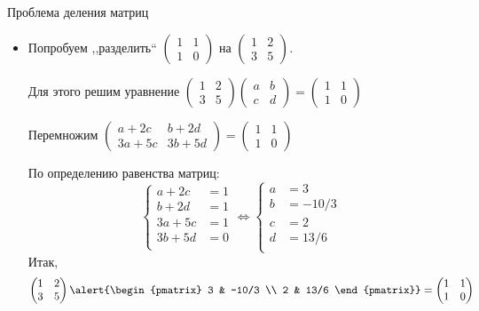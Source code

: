 \documentclass[unicode,11pt,notheorems]{beamer}
\begin{document}
\begin{frame}[allowframebreaks]{Проблема деления матриц}
\begin{itemize}
\item Попробуем ,,разделить`` $\begin{pmatrix} 1 & 1 \\ 1 & 0 \end{pmatrix}$ на $\begin{pmatrix} 1 & 2 \\ 3 & 5 \end{pmatrix}$.

Для этого решим уравнение
$
\begin{pmatrix} 1 & 2 \\ 3 & 5 \end{pmatrix}
\begin{pmatrix} a & b \\ c & d \end{pmatrix} = \begin{pmatrix} 1 & 1 \\ 1 & 0 \end{pmatrix}
$

Перемножим
$
\begin{pmatrix} a+2c & b+2d \\ 3a+5c & 3b+5d \end{pmatrix} = \begin{pmatrix} 1 & 1 \\ 1 & 0 \end{pmatrix}
$

По определению равенства матриц:
$$
\left\lbrace\begin{aligned}
	a+2c &= 1\\
	b+2d &=1\\
	3a+5c &=1\\
	3b+5d &=0\\
\end{aligned}
\right.
\Longleftrightarrow
\left\lbrace\begin{aligned}
	a &= 3\\
	b &= -10/3\\
	c &= 2\\
	d &= 13/6\\
\end{aligned}
\right.
$$
Итак,
$$
\begin{pmatrix} 1 & 2 \\ 3 & 5 \end{pmatrix}
\alert{\begin{pmatrix} 3 & -10/3 \\ 2 & 13/6 \end{pmatrix}} = \begin{pmatrix} 1 & 1 \\ 1 & 0 \end{pmatrix}
$$


\end{itemize}
\end{frame}
\end{document}
